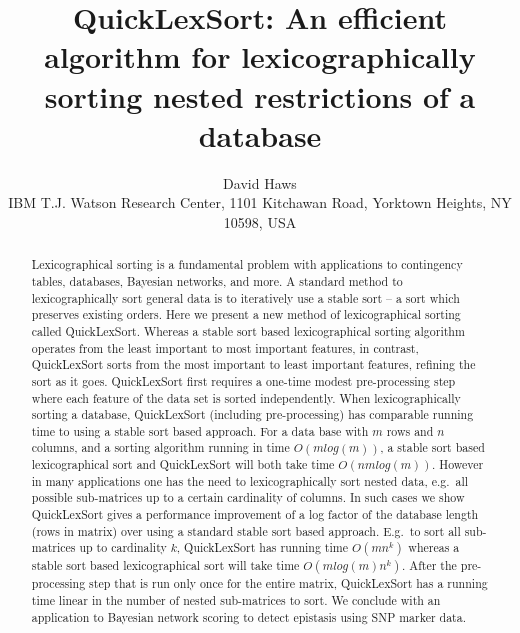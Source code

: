 \documentclass[a4paper,10pt,reqno]{amsart}
\title[QuickLexSort]{QuickLexSort: An efficient algorithm for lexicographically sorting nested restrictions of a database}
\author[]{David Haws\\IBM T.J. Watson Research Center, 1101 Kitchawan Road, Yorktown Heights, NY 10598, USA}
\date{}
\theoremstyle{definition}
\begin{document}
\begin{abstract}
Lexicographical sorting is a fundamental problem with applications to
contingency tables, databases, Bayesian networks, and more. A standard method
to lexicographically sort general data is to iteratively use a stable sort -- a
sort which preserves existing orders. Here we present a new method of
lexicographical sorting called QuickLexSort.  Whereas a stable sort based
lexicographical sorting algorithm operates from the least important to most
important features, in contrast, QuickLexSort sorts from the most important to
least important features, refining the sort as it goes.  QuickLexSort first
requires a one-time modest pre-processing step where each feature of the data set is
sorted independently.  When lexicographically sorting a database, QuickLexSort
(including pre-processing) has comparable running time to using a stable sort
based approach.  For a data base with $m$ rows and $n$ columns, and a sorting
algorithm running in time $O(mlog(m))$, a stable sort based lexicographical
sort and QuickLexSort will both take time $O(nmlog(m))$.  However in many
applications one has the need to lexicographically sort nested data, e.g.\ all
possible sub-matrices up to a certain cardinality of columns. In such cases we
show QuickLexSort gives a performance improvement of a log factor
of the database length (rows in matrix) over using a standard stable sort based
approach. E.g.\ to sort all sub-matrices up to cardinality $k$, QuickLexSort
has running time $O(mn^k)$ whereas a stable sort based lexicographical sort
will take time $O(mlog(m)n^k)$.  After the pre-processing step that is run only
once for the entire matrix, QuickLexSort has a running time linear in the
number of nested sub-matrices to sort. We conclude with an application to
Bayesian network scoring to detect epistasis using SNP marker data.

\end{abstract}

\maketitle
\footnotetext{\today}
\end{document}
